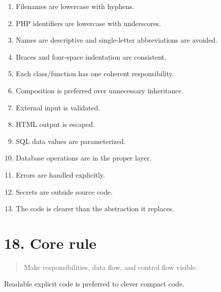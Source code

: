 \documentclass[11pt,a4paper]{article}
\begin{document}
\begin{enumerate}
\def\labelenumi{\arabic{enumi}.}
\tightlist
\item
  Filenames are lowercase with hyphens.
\item
  PHP identifiers are lowercase with underscores.
\item
  Names are descriptive and single-letter abbreviations are avoided.
\item
  Braces and four-space indentation are consistent.
\item
  Each class/function has one coherent responsibility.
\item
  Composition is preferred over unnecessary inheritance.
\item
  External input is validated.
\item
  HTML output is escaped.
\item
  SQL data values are parameterized.
\item
  Database operations are in the proper layer.
\item
  Errors are handled explicitly.
\item
  Secrets are outside source code.
\item
  The code is clearer than the abstraction it replaces.
\end{enumerate}

\section{18. Core rule}\label{18-core-rule}

\begin{quote}
Make responsibilities, data flow, and control flow visible.
\end{quote}

Readable explicit code is preferred to clever compact code.
\end{document}
